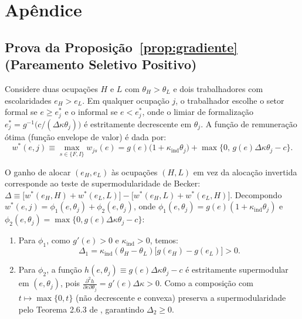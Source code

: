 \section{Apêndice}

\setcounter{table}{0}
\renewcommand{\thetable}{A\arabic{table}}

\subsection{Prova da Proposição~\ref{prop:gradiente} (Pareamento Seletivo Positivo)}

Considere duas ocupações $H$ e $L$ com $\theta_H > \theta_L$ e dois trabalhadores com escolaridades $e_H > e_L$. Em qualquer ocupação $j$, o trabalhador escolhe o setor formal se $e \ge e_j^*$ e o informal se $e < e_j^*$, onde o limiar de formalização $e_j^* = g^{-1}\big(c / (\Delta\kappa \theta_j)\big)$ é estritamente decrescente em $\theta_j$. A função de remuneração ótima (função envelope de valor) é dada por:
\begin{equation}
    w^*(e, j) \equiv \max_{s \in \{F, I\}} w_{js}(e) = g(e)\big(1 + \kappa_{\text{ind}}\theta_j\big)
    + \max\big\{0, \, g(e)\Delta\kappa\theta_j - c\big\}.
    \label{eq:envelope}
\end{equation}

O ganho de alocar $(e_H, e_L)$ às ocupações $(H, L)$ em vez da alocação invertida corresponde ao teste de supermodularidade de Becker: $\Delta \equiv \big[w^*(e_H, H) + w^*(e_L, L)\big] - \big[w^*(e_H, L) + w^*(e_L, H)\big]$. Decompondo $w^*(e, j) = \phi_1(e, \theta_j) + \phi_2(e, \theta_j)$, onde $\phi_1(e, \theta_j) = g(e)(1 + \kappa_{\text{ind}}\theta_j)$ e $\phi_2(e, \theta_j) = \max\{0, g(e)\Delta\kappa\theta_j - c\}$:
\begin{enumerate}
    \item Para $\phi_1$, como $g'(e) > 0$ e $\kappa_{\text{ind}} > 0$, temos:
    \begin{equation}
        \Delta_1 = \kappa_{\text{ind}}(\theta_H - \theta_L)\big[g(e_H) - g(e_L)\big] > 0.
    \end{equation}
    \item Para $\phi_2$, a função $h(e, \theta_j) \equiv g(e)\Delta\kappa\theta_j - c$ é estritamente supermodular em $(e, \theta_j)$, pois $\frac{\partial^2 h}{\partial e \partial \theta_j} = g'(e)\Delta\kappa > 0$. Como a composição com $t \mapsto \max\{0, t\}$ (não decrescente e convexa) preserva a supermodularidade pelo Teorema 2.6.3 de \citet{topkis1998supermodularity}, garantindo $\Delta_2 \ge 0$.
\end{enumerate}

